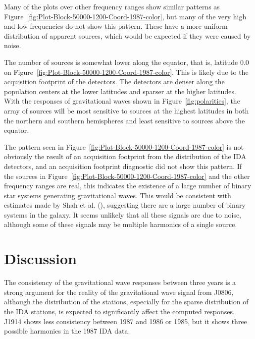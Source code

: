 
Many of the plots over other frequency ranges show similar patterns as Figure~\ref{fig:Plot-Block-50000-1200-Coord-1987-color},  but many of the very high and low frequencies do not show this pattern.  These have a more uniform distribution of apparent sources, which would be expected if they were caused by noise.  

The number of sources is somewhat lower along the equator, that is, latitude 0.0 on Figure~\ref{fig:Plot-Block-50000-1200-Coord-1987-color}.  This is likely due to the acquisition footprint of the detectors.  The detectors are denser along the population centers at the lower latitudes and sparser at the higher latitudes.  With the responses of gravitational waves shown in Figure~\ref{fig:polarities}, the array of sources will be most sensitive to sources at the highest latitudes in both the northern and southern hemispheres and least sensitive to sources above the equator.  

The pattern seen in Figure~\ref{fig:Plot-Block-50000-1200-Coord-1987-color}  is not obviously the result of an acquisition footprint from the distribution of the IDA detectors, and an acquisition footprint diagnostic did not show this pattern.    
If the sources in Figure~\ref{fig:Plot-Block-50000-1200-Coord-1987-color} and the other frequency ranges are real, this indicates the existence of a large number of binary star systems generating gravitational waves.  
This would be consistent with estimates made by Shah et al. (\citeyear{Shah_2015}), suggesting there are a large number of binary systems in the galaxy.  
It seems unlikely that all these signals are due to noise, although some of these signals may be multiple harmonics of a single source. 


\section{Discussion}

The consistency of the gravitational wave responses between three years is a strong argument for the reality of the gravitational wave signal from J0806, although the distribution of the stations, especially for the sparse distribution of the IDA stations, is expected to significantly affect the computed responses.  
J1914 shows less consistency between 1987 and 1986 or 1985, but it shows three possible harmonics in the 1987 IDA data.

